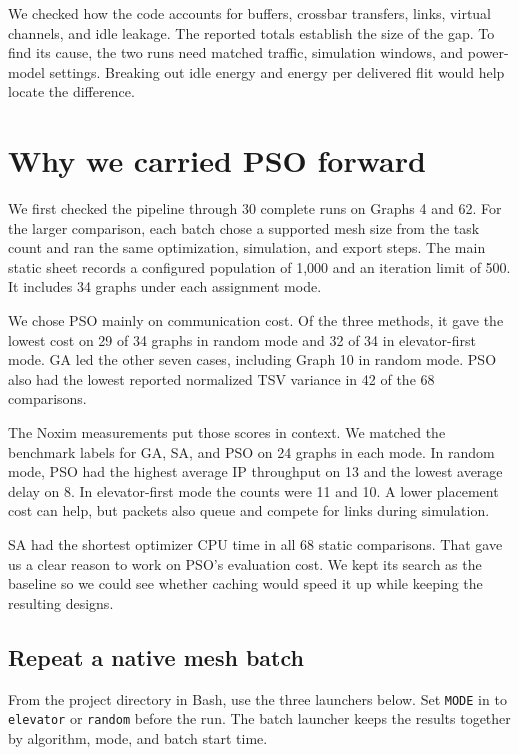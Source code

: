 \documentclass[12pt,a4paper]{article}
\newcommand{\code}[1]{\texttt{#1}}
\begin{document}
We checked how the code accounts for buffers, crossbar transfers, links, virtual channels, and idle leakage. The reported totals establish the size of the gap. To find its cause, the two runs need matched traffic, simulation windows, and power-model settings. Breaking out idle energy and energy per delivered flit would help locate the difference.

\clearpage
\section{Why we carried PSO forward}

We first checked the pipeline through 30 complete runs on Graphs 4 and 62. For the larger comparison, each batch chose a supported mesh size from the task count and ran the same optimization, simulation, and export steps. The main static sheet records a configured population of 1,000 and an iteration limit of 500. It includes 34 graphs under each assignment mode.

We chose PSO mainly on communication cost. Of the three methods, it gave the lowest cost on 29 of 34 graphs in random mode and 32 of 34 in elevator-first mode. GA led the other seven cases, including Graph 10 in random mode. PSO also had the lowest reported normalized TSV variance in 42 of the 68 comparisons.

The Noxim measurements put those scores in context. We matched the benchmark labels for GA, SA, and PSO on 24 graphs in each mode. In random mode, PSO had the highest average IP throughput on 13 and the lowest average delay on 8. In elevator-first mode the counts were 11 and 10. A lower placement cost can help, but packets also queue and compete for links during simulation.

SA had the shortest optimizer CPU time in all 68 static comparisons. That gave us a clear reason to work on PSO's evaluation cost. We kept its search as the baseline so we could see whether caching would speed it up while keeping the resulting designs.

\subsection{Repeat a native mesh batch}

From the project directory in Bash, use the three launchers below. Set \code{MODE} in  to \code{elevator} or \code{random} before the run. The batch launcher keeps the results together by algorithm, mode, and batch start time.
\end{document}
